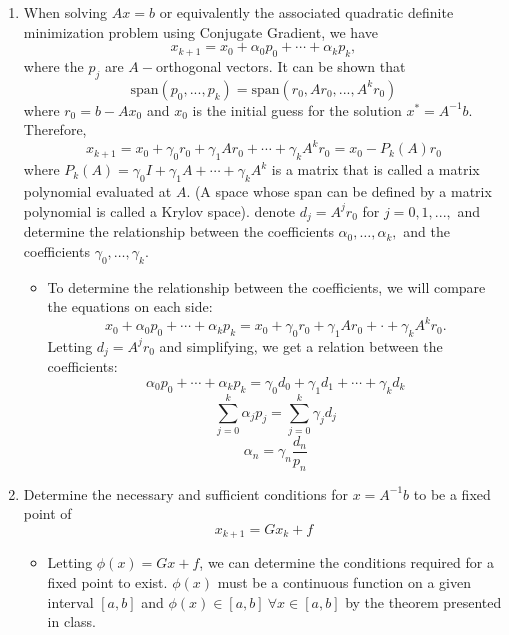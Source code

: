 \documentclass[10pt]{article}
\begin{document}
\begin{enumerate}
\clearpage

\item When solving $Ax = b$ or equivalently the associated quadratic definite minimization problem using Conjugate Gradient, we have
	$$ x_{k+1} = x_0 + \alpha_0p_0 + \cdots + \alpha_kp_k,$$
	where the $p_j$ are $A-$orthogonal vectors. It can be shown that
	$$ \mbox{span}(p_0, ..., p_k) = \mbox{span}(r_0, Ar_0, ..., A^kr_0)$$
	where $r_0 = b - Ax_0$ and $x_0$ is the initial guess for the solution $x^{*} = A^{-1}b$. Therefore,
	$$ x_{k+1} = x_0 + \gamma_0r_0 + \gamma_1Ar_0 + \cdots + \gamma_kA^kr_0 = x_0 - P_k(A)r_0$$
	where $P_k(A) = \gamma_0I + \gamma_1A + \cdots + \gamma_kA^k$ is a matrix that is called a matrix polynomial evaluated at $A$. (A space whose span can be defined by a matrix polynomial is called a Krylov space). denote $d_j = A^jr_0$ for $j = 0, 1, ...,$ and determine the relationship between the coefficients $\alpha_0, \ldots, \alpha_k,$ and the coefficients $\gamma_0, \ldots, \gamma_k$.
	\begin{itemize}
		\item To determine the relationship between the coefficients, we will compare the equations on each side:
		$$ x_0 + \alpha_0p_0 + \cdots + \alpha_kp_k = x_0 + \gamma_0r_0 + \gamma_1Ar_0 + \cdot + \gamma_kA^kr_0.$$
		Letting $d_j = A^jr_0$ and simplifying, we get a relation between the coefficients:
		$$ \alpha_0p_0 + \cdots + \alpha_kp_k = \gamma_0d_0 + \gamma_1d_1 + \cdots + \gamma_kd_k $$
		$$ \sum_{j=0}^k \alpha_jp_j = \sum_{j=0}^k \gamma_jd_j $$
		$$ \alpha_n = \gamma_n \frac{d_n}{p_n}$$
	\end{itemize}

\clearpage

\item Determine the necessary and sufficient conditions for $x = A^{-1}b$ to be a fixed point of 
	$$ x_{k+1} = Gx_k + f$$
	\begin{itemize}
		\item Letting $\phi(x) = Gx + f$, we can determine the conditions required for a fixed point to exist. $\phi(x)$ must be a continuous function on a given interval $[a, b]$ and $\phi(x) \in [a, b] ~\forall x \in [a, b]$ by the theorem presented in class.
	\end{itemize}
\end{enumerate}
\clearpage %
\end{document}
